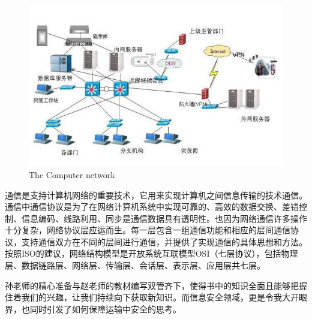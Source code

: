 \documentclass{article}
\begin{document}
\begin{figure}[h!]
	\centering
	\includegraphics[scale=0.7]{Computer_network}
	\caption{The Computer network}
	\label{fig:Computer_network}
\end{figure}

通信是支持计算机网络的重要技术，它用来实现计算机之间信息传输的技术通信。通信中通信协议是为了在网络计算机系统中实现可靠的、高效的数据交换、差错控制、信息编码、线路利用、同步是通信数据具有透明性。也因为网络通信许多操作十分复杂，网络协议层应运而生。每一层包含一组通信功能和相应的层间通信协议，支持通信双方在不同的层间进行通信，并提供了实现通信的具体思想和方法。按照ISO的建议，网络结构模型是开放系统互联模型OSI（七层协议），包括物理层、数据链路层、网络层、传输层、会话层、表示层、应用层共七层。\par
孙老师的精心准备与赵老师的教材编写双管齐下，使得书中的知识全面且能够把握住着我们的兴趣，让我们持续向下获取新知识。而信息安全领域，更是令我大开眼界，也同时引发了如何保障运输中安全的思考。\par
\end{document}
